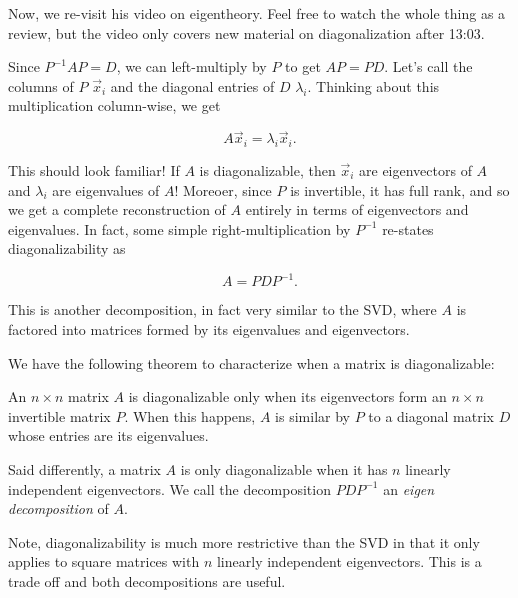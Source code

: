 \documentclass{ximera}
\begin{document}
Now, we re-visit his video on eigentheory. Feel free to watch the whole thing as a review, but the video only covers new material on diagonalization after 13:03.

\begin{center}
\end{center}

\begin{exploration}

    Since $P^{-1}AP=D$, we can left-multiply by $P$ to get $AP=PD$. Let's call the columns of $P$ $\vec{x}_i$ and the diagonal entries of $D$ $\lambda_i$. Thinking about this multiplication column-wise, we get

    $$A\vec{x}_i=\lambda_i\vec{x}_i.$$

    This should look familiar! If $A$ is diagonalizable, then $\vec{x}_i$ are eigenvectors of $A$ and $\lambda_i$ are eigenvalues of $A$! Moreoer, since $P$ is invertible, it has full rank, and so we get a complete reconstruction of $A$ entirely in terms of eigenvectors and eigenvalues. In fact, some simple right-multiplication by $P^{-1}$ re-states diagonalizability as

    $$A=PDP^{-1}.$$


\end{exploration}

This is another decomposition, in fact very similar to the SVD, where $A$ is factored into matrices formed by its eigenvalues and eigenvectors. 

We have the following theorem to characterize when a matrix is diagonalizable:

\begin{theorem}

  An $n\times n$ matrix $A$ is diagonalizable only when its eigenvectors form an $n\times n$ invertible matrix $P$. When this happens, $A$ is similar by $P$ to a diagonal matrix $D$ whose entries are its eigenvalues.

  Said differently, a matrix $A$ is only diagonalizable when it has $n$ linearly independent eigenvectors. We call the decomposition $PDP^{-1}$ an \emph{eigen decomposition} of $A$.

\end{theorem}

Note, diagonalizability is much more restrictive than the SVD in that it only applies to square matrices with $n$ linearly independent eigenvectors. This is a trade off and both decompositions are useful. 
\end{document}
